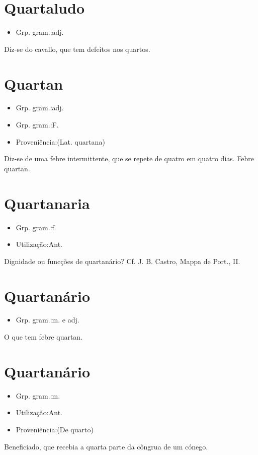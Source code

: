\section{Quartaludo}
\begin{itemize}
\item {Grp. gram.:adj.}
\end{itemize}
Diz-se do cavallo, que tem defeitos nos quartos.
\section{Quartan}
\begin{itemize}
\item {Grp. gram.:adj.}
\end{itemize}
\begin{itemize}
\item {Grp. gram.:F.}
\end{itemize}
\begin{itemize}
\item {Proveniência:(Lat. \textunderscore quartana\textunderscore )}
\end{itemize}
Diz-se de uma febre intermittente, que se repete de quatro em quatro dias.
Febre quartan.
\section{Quartanaria}
\begin{itemize}
\item {Grp. gram.:f.}
\end{itemize}
\begin{itemize}
\item {Utilização:Ant.}
\end{itemize}
Dignidade ou funcções de quartanário? Cf. J. B. Castro, \textunderscore Mappa de Port.\textunderscore , II.
\section{Quartanário}
\begin{itemize}
\item {Grp. gram.:m.  e  adj.}
\end{itemize}
O que tem febre quartan.
\section{Quartanário}
\begin{itemize}
\item {Grp. gram.:m.}
\end{itemize}
\begin{itemize}
\item {Utilização:Ant.}
\end{itemize}
\begin{itemize}
\item {Proveniência:(De \textunderscore quarto\textunderscore )}
\end{itemize}
Beneficiado, que recebia a quarta parte da côngrua de um cónego.
